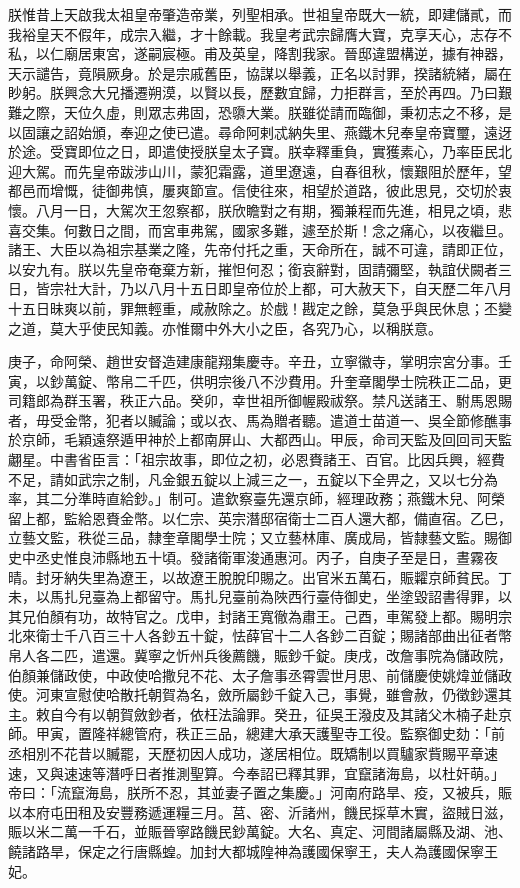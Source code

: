 \begin{pinyinscope}
 朕惟昔上天啟我太祖皇帝肇造帝業，列聖相承。世祖皇帝既大一統，即建儲貳，而我裕皇天不假年，成宗入繼，才十餘載。我皇考武宗歸膺大寶，克享天心，志存不私，以仁廟居東宮，遂嗣宸極。甫及英皇，降割我家。晉邸違盟構逆，據有神器，天示譴告，竟隕厥身。於是宗戚舊臣，協謀以舉義，正名以討罪，揆諸統緒，屬在眇躬。朕興念大兄播遷朔漠，以賢以長，歷數宜歸，力拒群言，至於再四。乃曰艱難之際，天位久虛，則眾志弗固，恐隳大業。朕雖從請而臨御，秉初志之不移，是以固讓之詔始頒，奉迎之使已遣。尋命阿剌忒納失里、燕鐵木兒奉皇帝寶璽，遠迓於途。受寶即位之日，即遣使授朕皇太子寶。朕幸釋重負，實獲素心，乃率臣民北迎大駕。而先皇帝跋涉山川，蒙犯霜露，道里遼遠，自春徂秋，懷艱阻於歷年，望都邑而增慨，徒御弗慎，屢爽節宣。信使往來，相望於道路，彼此思見，交切於衷懷。八月一日，大駕次王忽察都，朕欣瞻對之有期，獨兼程而先進，相見之頃，悲喜交集。何數日之間，而宮車弗駕，國家多難，遽至於斯！念之痛心，以夜繼旦。諸王、大臣以為祖宗基業之隆，先帝付托之重，天命所在，誠不可違，請即正位，以安九有。朕以先皇帝奄棄方新，摧怛何忍；銜哀辭對，固請彌堅，執誼伏闕者三日，皆宗社大計，乃以八月十五日即皇帝位於上都，可大赦天下，自天歷二年八月十五日昧爽以前，罪無輕重，咸赦除之。於戲！戡定之餘，莫急乎與民休息；丕變之道，莫大乎使民知義。亦惟爾中外大小之臣，各究乃心，以稱朕意。



 庚子，命阿榮、趙世安督造建康龍翔集慶寺。辛丑，立寧徽寺，掌明宗宮分事。壬寅，以鈔萬錠、幣帛二千匹，供明宗後八不沙費用。升奎章閣學士院秩正二品，更司籍郎為群玉署，秩正六品。癸卯，幸世祖所御幄殿祓祭。禁凡送諸王、駙馬恩賜者，毋受金幣，犯者以贓論；或以衣、馬為贈者聽。遣道士苗道一、吳全節修醮事於京師，毛穎遠祭遁甲神於上都南屏山、大都西山。甲辰，命司天監及回回司天監翽星。中書省臣言：「祖宗故事，即位之初，必恩賚諸王、百官。比因兵興，經費不足，請如武宗之制，凡金銀五錠以上減三之一，五錠以下全畀之，又以七分為率，其二分準時直給鈔。」制可。遣欽察臺先還京師，經理政務；燕鐵木兒、阿榮留上都，監給恩賚金幣。以仁宗、英宗潛邸宿衛士二百人還大都，備直宿。乙巳，立藝文監，秩從三品，隸奎章閣學士院；又立藝林庫、廣成局，皆隸藝文監。賜御史中丞史惟良沛縣地五十頃。發諸衛軍浚通惠河。丙子，自庚子至是日，晝霧夜晴。封牙納失里為遼王，以故遼王脫脫印賜之。出官米五萬石，賑糶京師貧民。丁未，以馬扎兒臺為上都留守。馬扎兒臺前為陜西行臺侍御史，坐塗毀詔書得罪，以其兄伯顏有功，故特官之。戊申，封諸王寬徹為肅王。己酉，車駕發上都。賜明宗北來衛士千八百三十人各鈔五十錠，怯薛官十二人各鈔二百錠；賜諸部曲出征者幣帛人各二匹，遣還。冀寧之忻州兵後薦饑，賑鈔千錠。庚戌，改詹事院為儲政院，伯顏兼儲政使，中政使哈撒兒不花、太子詹事丞霄雲世月思、前儲慶使姚煒並儲政使。河東宣慰使哈散托朝賀為名，斂所屬鈔千錠入己，事覺，雖會赦，仍徵鈔還其主。敕自今有以朝賀斂鈔者，依枉法論罪。癸丑，征吳王潑皮及其諸父木楠子赴京師。甲寅，置隆祥總管府，秩正三品，總建大承天護聖寺工役。監察御史劾：「前丞相別不花昔以贓罷，天歷初因人成功，遂居相位。既矯制以買驢家貲賜平章速速，又與速速等潛呼日者推測聖算。今奉詔已釋其罪，宜竄諸海島，以杜奸萌。」帝曰：「流竄海島，朕所不忍，其並妻子置之集慶。」河南府路旱、疫，又被兵，賑以本府屯田租及安豐務遞運糧三月。莒、密、沂諸州，饑民採草木實，盜賊日滋，賑以米二萬一千石，並賑晉寧路饑民鈔萬錠。大名、真定、河間諸屬縣及湖、池、饒諸路旱，保定之行唐縣蝗。加封大都城隍神為護國保寧王，夫人為護國保寧王妃。




\end{pinyinscope}

